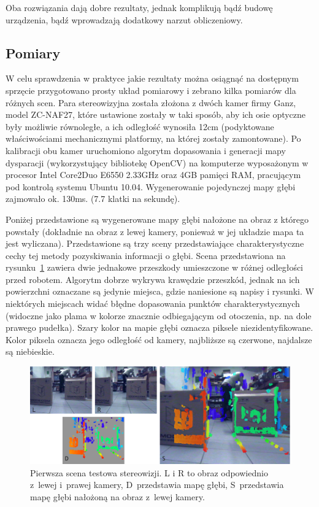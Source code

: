 Oba rozwiązania dają dobre rezultaty, jednak komplikują bądź budowę urządzenia,
bądź wprowadzają dodatkowy narzut obliczeniowy.

\subsection{Pomiary}

W celu sprawdzenia w praktyce jakie rezultaty można osiągnąć na dostępnym sprzęcie
przygotowano prosty układ pomiarowy i zebrano kilka pomiarów dla różnych scen.
Para stereowizyjna została złożona z dwóch kamer firmy Ganz, model ZC-NAF27, które
ustawione zostały w taki sposób, aby ich osie optyczne były możliwie równoległe,
a ich odległość wynosiła 12cm (podyktowane właściwościami mechanicznymi platformy,
na której zostały zamontowane). Po kalibracji obu kamer uruchomiono algorytm
dopasowania i generacji mapy dysparacji (wykorzystujący bibliotekę OpenCV) na
komputerze wyposażonym w procesor Intel Core2Duo E6550 2.33GHz oraz 4GB pamięci
RAM, pracującym pod kontrolą systemu Ubuntu 10.04. Wygenerowanie pojedynczej mapy
głębi zajmowało ok. 130ms. (7.7 klatki na sekundę).

Poniżej przedstawione są wygenerowane mapy głębi nałożone na obraz z którego powstały
(dokładnie na obraz z lewej kamery, ponieważ w jej układzie mapa ta jest wyliczana).
Przedstawione są trzy sceny przedstawiające charakterystyczne cechy tej metody
pozyskiwania informacji o głębi. Scena przedstawiona na rysunku~\ref{fig:stereo_1}
zawiera dwie jednakowe przeszkody umieszczone w różnej odległości przed robotem.
Algorytm dobrze wykrywa krawędzie przeszkód, jednak na ich powierzchni oznaczane
są jedynie miejsca, gdzie naniesione są napisy i rysunki. W niektórych miejscach
widać błędne dopasowania punktów charakterystycznych (widoczne jako plama w kolorze
znacznie odbiegającym od otoczenia, np. na dole prawego pudełka). Szary kolor na
mapie głębi oznacza piksele niezidentyfikowane. Kolor piksela oznacza jego odległość
od kamery, najbliższe są czerwone, najdalsze są niebieskie.

\begin{figure}[h!]
\centering
\includegraphics[width=\columnwidth]{../img/stereo_1}
\caption[Pierwsza scena testowa stereowizji]{Pierwsza scena testowa stereowizji. L i R to obraz odpowiednio z~lewej i~prawej kamery, D~przedstawia mapę głębi, S~przedstawia mapę głębi nałożoną na obraz z~lewej kamery.}
\label{fig:stereo_1}
\end{figure}

